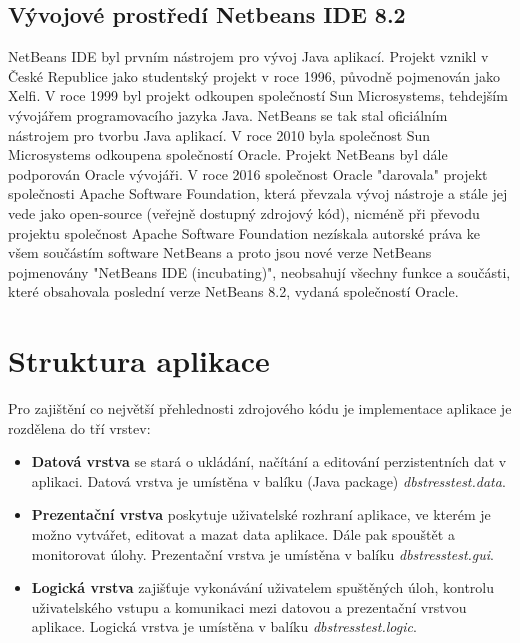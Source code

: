 \documentclass[czech,bachelor,public,dept460,male,cpdeclaration,twoside]{diploma}
\begin{document}
\subsection{Vývojové prostředí Netbeans IDE 8.2} \label{netbeans}
NetBeans IDE byl prvním nástrojem pro vývoj Java aplikací. Projekt vznikl v České Republice jako studentský projekt v roce 1996, původně pojmenován jako Xelfi. V roce 1999 byl projekt odkoupen společností Sun Microsystems, tehdejším vývojářem programovacího jazyka Java. NetBeans se tak stal oficiálním nástrojem pro tvorbu Java aplikací. V roce 2010 byla společnost Sun Microsystems odkoupena společností Oracle. Projekt NetBeans byl dále podporován Oracle vývojáři. V roce 2016 společnost Oracle "darovala" projekt společnosti Apache Software Foundation, která převzala vývoj nástroje a stále jej vede jako open-source (veřejně dostupný zdrojový kód), nicméně při převodu projektu společnost Apache Software Foundation nezískala autorské práva ke všem součástím software NetBeans a proto jsou nové verze NetBeans pojmenovány "NetBeans IDE (incubating)", neobsahují všechny funkce a součásti, které obsahovala poslední verze NetBeans 8.2, vydaná společností Oracle. \cite{netbeans}


\section{Struktura aplikace}
Pro zajištění co největší přehlednosti zdrojového kódu je implementace aplikace je rozdělena do tří vrstev:
\begin{itemize}
  	\item \textbf{Datová vrstva} se stará o ukládání, načítání a editování perzistentních dat v aplikaci. Datová vrstva je umístěna v balíku (Java package) \textit{dbstresstest.data}.
  	\item \textbf{Prezentační vrstva} poskytuje uživatelské rozhraní aplikace, ve kterém je možno vytvářet, editovat a mazat data aplikace. Dále pak spouštět a monitorovat úlohy. Prezentační vrstva je umístěna v balíku \textit{dbstresstest.gui}.
  	\item \textbf{Logická vrstva} zajišťuje vykonávání uživatelem spuštěných úloh, kontrolu uživatelského vstupu a komunikaci mezi datovou a prezentační vrstvou aplikace. Logická vrstva je umístěna v balíku \textit{dbstresstest.logic}.
\end{itemize}  	
\newpage
\end{document}
